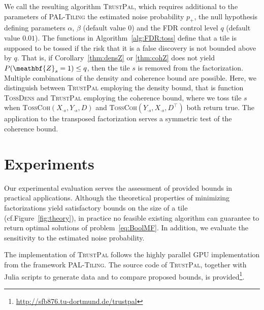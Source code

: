 We call the resulting algorithm \textsc{TrustPal}, which requires additional to the parameters of \textsc{PAL-Tiling} the estimated noise probability $p_+$, the null hypothesis defining parameters $\alpha$, $\beta$ (default value $0$) and the FDR control level $q$ (default value $0.01$). 
The functions in Algorithm~\ref{alg:FDR:toss} define that a tile is supposed to be tossed if the risk that it is a false discovery is not  bounded above by $q$. That is, if Corollary~\ref{thm:densZ} or \ref{thm:cohZ} does not yield $P(\meathbf{Z}_s=1)\leq q$, then the tile $s$ is removed from the factorization. Multiple combinations of the density and coherence bound are possible. Here, we distinguish between \textsc{TrustPal} employing the density bound, that is function \textsc{TossDens} and \textsc{TrustPal} employing the coherence bound, where we toss tile $s$ when \textsc{TossCoh}$(X_{\cdot s},Y_{\cdot s},D)$ and \textsc{TossCoh}$(Y_{\cdot s},X_{\cdot s},D^\top)$ both return true.
The application to the transposed factorization serves a symmetric test of the coherence bound. 
\section{Experiments}\label{sec:TP:experiments}
Our experimental evaluation serves the assessment of provided bounds in practical applications. Although the theoretical properties of minimizing factorizations yield satisfactory bounds on the size of a tile (cf.\@ Figure~\ref{fig:theory}), in practice no feasible existing algorithm can guarantee to return optimal solutions of problem~\eqref{eq:BoolMF}. 
In addition, we evaluate the sensitivity to the estimated noise probability.

The implementation of \textsc{TrustPal} follows the highly parallel  GPU implementation from the framework \textsc{PAL-Tiling}. The source code of \textsc{TrustPal}, together with Julia scripts to generate data and to compare proposed bounds, is provided\footnote{\url{http://sfb876.tu-dortmund.de/trustpal}}.

